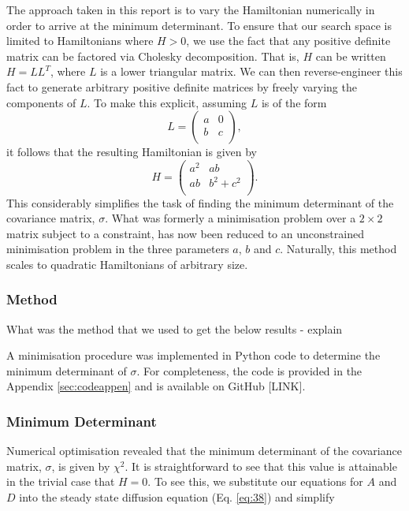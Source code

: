 \documentclass[11pt,a4paper]{article}
\numberwithin{equation}{section}
\begin{document}
	The approach taken in this report is to vary the Hamiltonian numerically in order to arrive at the minimum determinant. To ensure that our search space is limited to Hamiltonians where $H>0$, we use the fact that any positive definite matrix can be factored via Cholesky decomposition. That is, $H$ can be written	$H = LL^T$,	where $L$ is a lower triangular matrix. We can then reverse-engineer this fact to generate arbitrary positive definite matrices by freely varying the components of $L$. To make this explicit, assuming $L$ is of the form \begin{equation}\label{eq:39}
	L = \begin{pmatrix}
	a & 0  \\
	b & c\\
	\end{pmatrix},
	\end{equation}
	it follows that the resulting Hamiltonian is given by
	\begin{equation} \label{eq:41}
	H = \begin{pmatrix}
	a^{2} & ab  \\
	ab & b^{2}+c^{2}\\
	\end{pmatrix}.
	\end{equation}
	This considerably simplifies the task of finding the minimum determinant of the covariance matrix, $\sigma$. What was formerly a minimisation problem over a $2\times2$ matrix subject to a constraint, has now been reduced to an unconstrained minimisation problem in the three parameters $a$, $b$ and $c$. Naturally, this method scales to quadratic Hamiltonians of arbitrary size.
	
	\color{red}\subsubsection{Method}\color{black}
	What was the method that we used to get the below results - explain
	
	A minimisation procedure was implemented in Python code to determine the minimum determinant of $\sigma$. For completeness, the code is provided in the Appendix \ref{sec:codeappen} and is available on GitHub [LINK].
	
	\subsubsection{Minimum Determinant}
	
	Numerical optimisation revealed that the minimum determinant of the covariance matrix, $\sigma$, is given by $\chi^{2}$. It is straightforward to see that this value is attainable in the trivial case that $H=0$. To see this, we substitute our equations for $A$ and $D$ into the steady state diffusion equation (Eq. \ref{eq:38}) and simplify
	
\end{document}
